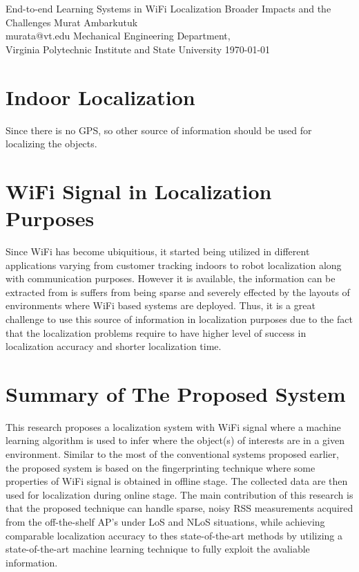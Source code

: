 \documentclass{article}
\begin{document}
\label{Cover}
	\begin{center}
	\Large{End-to-end Learning Systems in WiFi Localization}
	\vfill
    Broader Impacts and the Challenges
    \vfill
	Murat Ambarkutuk \\ murata@vt.edu
	\vfill
	Mechanical Engineering Department,\\ Virginia Polytechnic Institute and State University
	\vfill
	\today
	\end{center}
\pagebreak

\section{Indoor Localization}
    Since there is no GPS, so other source of information should be used for localizing the objects.

\section{WiFi Signal in Localization Purposes}
    Since WiFi has become ubiquitious, it started being utilized in different applications varying from customer tracking indoors to robot localization along with communication purposes. %
    However it is available, the information can be extracted from is suffers from being sparse and severely effected by the layouts of environments where WiFi based systems are deployed.
    Thus, it is a great challenge to use this source of information in localization purposes due to the fact that the localization problems require to have higher level of success in localization accuracy and shorter localization time.

\section{Summary of The Proposed System}
    This research proposes a localization system with WiFi signal where a machine learning algorithm is used to infer where the object(s) of interests are in a given environment.
    Similar to the most of the conventional systems proposed earlier, the proposed system is based on the fingerprinting technique where some properties of WiFi signal is obtained in offline stage.
    The collected data are then used for localization during online stage.
    The main contribution of this research is that the proposed technique can handle sparse, noisy RSS measurements acquired from the off-the-shelf AP's under LoS and NLoS situations, while achieving comparable localization accuracy to thes state-of-the-art methods by utilizing a state-of-the-art machine learning technique to fully exploit the avaliable information.
\end{document}
